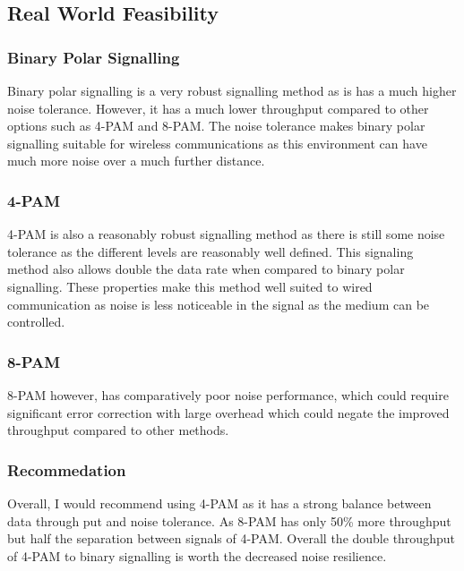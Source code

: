 \subsection{Real World Feasibility}

\subsubsection{Binary Polar Signalling}
Binary polar signalling is a very robust signalling method as is has a much higher noise tolerance. 
However, it has a much lower throughput compared to other options such as 4-PAM and 8-PAM. The noise
tolerance makes binary polar signalling suitable for wireless communications as this environment can have
much more noise over a much further distance.


\subsubsection{4-PAM}
4-PAM is also a reasonably robust signalling method as there is still some noise tolerance as the different levels
are reasonably well defined. This signaling method also allows double the data rate when compared to binary polar signalling.
These properties make this method well suited to wired communication as noise is less noticeable in the signal as the medium
can be controlled.


\subsubsection{8-PAM}
8-PAM however, has comparatively poor noise performance, which could require significant error correction with large overhead which could negate the
improved throughput compared to other methods.

\subsubsection{Recommedation}
Overall, I would recommend using 4-PAM as it has a strong balance between data through put and noise tolerance. As 8-PAM has only 50\% more
throughput but half the separation between signals of 4-PAM. Overall the double throughput of 4-PAM to binary signalling is worth
the decreased noise resilience.

